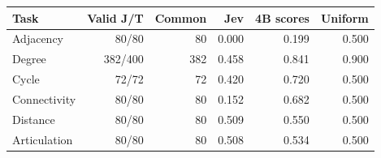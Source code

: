\begin{tabular}{lrrrrr}
\toprule
Task & Valid J/T & Common & Jev & 4B scores & Uniform \\
\midrule
Adjacency & 80/80 & 80 & 0.000 & 0.199 & 0.500 \\
Degree & 382/400 & 382 & 0.458 & 0.841 & 0.900 \\
Cycle & 72/72 & 72 & 0.420 & 0.720 & 0.500 \\
Connectivity & 80/80 & 80 & 0.152 & 0.682 & 0.500 \\
Distance & 80/80 & 80 & 0.509 & 0.550 & 0.500 \\
Articulation & 80/80 & 80 & 0.508 & 0.534 & 0.500 \\
\bottomrule
\end{tabular}
